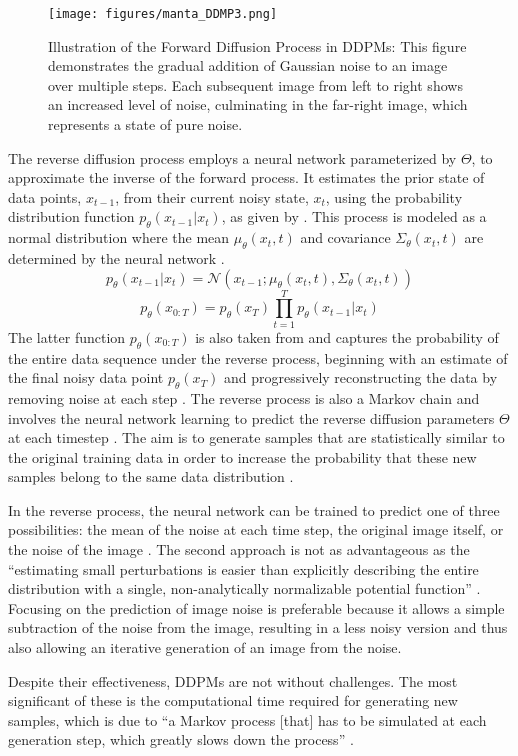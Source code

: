 \begin{figure}[ht]
\centering
  \texttt{[image: figures/manta\_DDMP3.png]}
  \caption{Illustration of the Forward Diffusion Process in DDPMs: This figure demonstrates the gradual addition of Gaussian noise to an image over multiple steps. Each subsequent image from left to right shows an increased level of noise, culminating in the far-right image, which represents a state of pure noise.}\label{fig:figureForwardProcess}
\end{figure}

The reverse diffusion process employs a neural network parameterized by \(\Theta\), to approximate the inverse of the forward process. It estimates the prior state of data points, \( x_{t-1} \), from their current noisy state, \( x_t \), using the probability distribution function \( p_\theta(x_{t-1} | x_t) \), as given by \citeauthor{martinez2023understanding}. This process is modeled as a normal distribution where the mean \( \mu_\theta(x_t, t) \) and covariance \( \Sigma_\theta(x_t, t) \) are determined by the neural network \citep{yangdiffusionSummary}.\[
  p_\theta(x_{t-1} | x_t) = \mathcal{N}(x_{t-1}; \mu_\theta(x_t, t), \Sigma_\theta(x_t, t))
\] \[p_\theta(x_{0:T}) = p_\theta(x_{T}) \prod_{t=1}^T p_\theta(x_{t-1} | x_t) \] The latter function \(p_\theta(x_{0:T})\) is also taken from \citeauthor{martinez2023understanding} and captures the probability of the entire data sequence under the reverse process, beginning with an estimate of the final noisy data point \(p_\theta(x_{T})\) and progressively reconstructing the data by removing noise at each step \citep{hoDDPMs,martinez2023understanding}. The reverse process is also a Markov chain and involves the neural network learning to predict the reverse diffusion parameters \(\Theta\) at each timestep \citep{yangdiffusionSummary}. The aim is to generate samples that are statistically similar to the original training data in order to increase the probability that these new samples belong to the same data distribution \citep{yangdiffusionSummary}.

In the reverse process, the neural network can be trained to predict one of three possibilities: the mean of the noise at each time step, the original image itself, or the noise of the image \citep{hoDDPMs}. The second approach is not as advantageous as the ``estimating small perturbations is easier than explicitly describing the entire distribution with a single, non-analytically normalizable potential function'' \citep{sohlDDPM}. Focusing on the prediction of image noise is preferable because it allows a simple subtraction of the noise from the image, resulting in a less noisy version and thus also allowing an iterative generation of an image from the noise.

Despite their effectiveness, DDPMs are not without challenges. The most significant of these is the computational time required for generating new samples, which is due to ``a Markov process [that] has to be simulated at each generation step, which greatly slows down the process'' \citep{martinez2023understanding}.